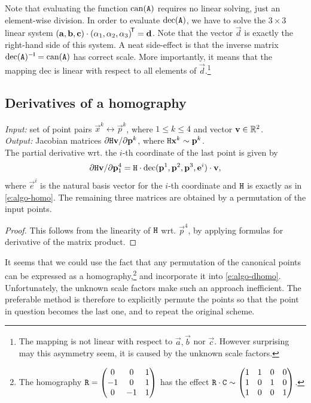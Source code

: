 Note that evaluating the function $\mathrm{can}(\mathtt{A})$ requires no linear solving, just an element-wise division.
In order to evaluate $\mathrm{dec}(\mathtt{A})$, we have to solve the $3 \times 3$ linear system $\left(\mathbf{a}, \mathbf{b}, \mathbf{c} \right) \cdot \left(\alpha_1, \alpha_2, \alpha_3 \right) ^{\!\mathsf{T}} = \mathbf{d}$.
Note that the vector $\vec d$ is exactly the right-hand side of this system.
A neat side-effect is that the inverse matrix $\mathrm{dec}(\mathtt{A}) ^{-\mathsf{I}} = \mathrm{can}(\mathtt{A})$ has correct scale. 
More importantly, it means that the mapping $\mathrm{dec}$ is linear with respect to all elements of $\vec d$.\footnote{
The mapping is not linear with respect to $\vec a, \vec b$ nor $\vec c$.
However surprising may this asymmetry seem, it is caused by the unknown scale factors.
}

\subsection{Derivatives of a homography}
\label{s:algo-dhomo}

\textit{Input:} set of point pairs $\vec x^k \leftrightarrow \vec p^k$, where $1 \leq k \leq 4$ and vector $\mathbf{v} \in \mathbb{R}^2$.\\
\textit{Output:} Jacobian matrices $\partial \mathtt{H} \mathbf{v} / \partial \mathbf{p}^k$, where $\mathtt{H} \mathbf{x}^k \sim \mathbf{p}^k$.\\

The partial derivative wrt. the $i$-th coordinate of the last point is given by
\begin{equation} \label{e:algo-dhomo}
\partial \mathtt{H} \mathbf{v} / \partial \mathbf{p}^4_1 = \mathtt{H} \cdot \mathrm{dec}(\mathbf{p}^1, \mathbf{p}^2, \mathbf{p}^3, \mathbf{e}^i) \cdot \mathbf{v},
\end{equation}
where $\vec e^i$ is the natural basis vector for the $i$-th coordinate and $\mathtt{H}$ is exactly as in \eqref{e:algo-homo}.
The remaining three matrices are obtained by a permutation of the input points.

\begin{proof}
This follows from the linearity of $\mathtt{H}$ wrt. $\vec p^4$, by applying formulas for derivative of the matrix product.
\end{proof}

It seems that we could use the fact that any permutation of the canonical points can be expressed as a homography,\footnote{
The homography $\mathtt{R} = \begin{pmatrix}
 0 & 0 & 1 \\
 -1 & 0 & 1 \\
 0 & -1 & 1
 \end{pmatrix}$ has the effect $\mathtt{R} \cdot \mathtt{C} \sim \begin{pmatrix}
 1 & 1 & 0 & 0 \\
 1 & 0 & 1 & 0 \\
 1 & 0 & 0 & 1
 \end{pmatrix}$.
} and incorporate it into \eqref{e:algo-dhomo}.
Unfortunately, the unknown scale factors make such an approach inefficient.
The preferable method is therefore to explicitly permute the points so that the point in question becomes the last one, and to repeat the original scheme.


